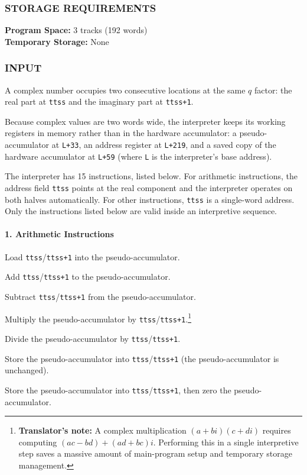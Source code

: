 \subsubsection*{STORAGE REQUIREMENTS}
\textbf{Program Space:} 3 tracks (192 words) \\
\textbf{Temporary Storage:} None

\subsubsection*{INPUT}
A complex number occupies two consecutive locations at the same $q$ factor: the real part at \texttt{ttss} and the imaginary part at \texttt{ttss+1}.

Because complex values are two words wide, the interpreter keeps its working registers in memory rather than in the hardware accumulator: a pseudo-accumulator at \texttt{L+33}, an address register at \texttt{L+219}, and a saved copy of the hardware accumulator at \texttt{L+59} (where \texttt{L} is the interpreter's base address).

The interpreter has 15 instructions, listed below. For arithmetic instructions, the address field \texttt{ttss} points at the real component and the interpreter operates on both halves automatically. For other instructions, \texttt{ttss} is a single-word address. Only the instructions listed below are valid inside an interpretive sequence.

\paragraph{1. Arithmetic Instructions}
\begin{description}[leftmargin=1.5em, itemsep=4pt]
    \item[\texttt{Bttss} (Bring):] Load \texttt{ttss}/\texttt{ttss+1} into the pseudo-accumulator.
    \item[\texttt{Attss} (Add):] Add \texttt{ttss}/\texttt{ttss+1} to the pseudo-accumulator.
    \item[\texttt{Sttss} (Subtract):] Subtract \texttt{ttss}/\texttt{ttss+1} from the pseudo-accumulator.
    \item[\texttt{Mttss} (Multiply):] Multiply the pseudo-accumulator by \texttt{ttss}/\texttt{ttss+1}.\footnote{\textbf{Translator's note:} A complex multiplication $(a+bi)(c+di)$ requires computing $(ac-bd) + (ad+bc)i$. Performing this in a single interpretive step saves a massive amount of main-program setup and temporary storage management.}
    \item[\texttt{Dttss} (Divide):] Divide the pseudo-accumulator by \texttt{ttss}/\texttt{ttss+1}.
    \item[\texttt{Httss} (Hold):] Store the pseudo-accumulator into \texttt{ttss}/\texttt{ttss+1} (the pseudo-accumulator is unchanged).
    \item[\texttt{Cttss} (Clear):] Store the pseudo-accumulator into \texttt{ttss}/\texttt{ttss+1}, then zero the pseudo-accumulator.
\end{description}

